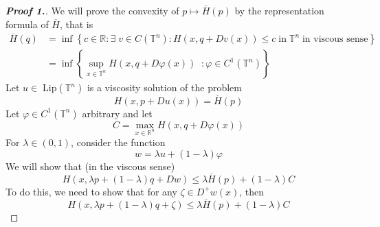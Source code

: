 \documentclass[12pt, oneside]{amsart}  	%
\begin{document}
\begin{proof}[\textbf{Proof 1.}] 
We will prove the convexity of $p\longmapsto\overline{H}(p)$ by the representation formula of $\overline{H}$, that is
\begin{align*}
\overline{H}(q) &= \inf \left\lbrace c\in \mathbb{R}: \exists\;v\in C(\mathbb{T}^n): H(x,q+Dv(x))\leq c\;\text{in}\;\mathbb{T}^n\;\text{in viscous sense}\right\rbrace \\
	            &= \inf\left\lbrace \sup_{x\in \mathbb{T}^n} H(x,q+D\varphi(x))\;\;:\varphi\in C^1(\mathbb{T}^n)\right\rbrace
\end{align*}
Let $u\in\;\text{Lip}(\mathbb{T}^n)$ is a viscosity solution of the problem
\begin{equation}\label{Epp}
H(x,p+Du(x)) = \overline{H}(p) \tag{$E_p$}
\end{equation}
Let $\varphi\in C^1(\mathbb{T}^n)$ arbitrary and let
\begin{equation*}
C = \max_{x\in \mathbb{R}^n} H(x,q+D\varphi(x))
\end{equation*}
For $\lambda\in (0,1)$, consider the function
\begin{equation*}
w = \lambda u + (1-\lambda) \varphi
\end{equation*}
We will show that (in the viscous sense)
\begin{equation}\label{Elambda p + 1-lambda q}
H\left(x,\lambda p +(1-\lambda)q+ Dw\right) \leq \lambda \overline{H}(p) + (1-\lambda)C 
\end{equation}
To do this, we need to show that for any $\zeta\in D^+w(x)$, then
\begin{equation*}
H\left(x,\lambda p +(1-\lambda)q+ \zeta\right) \leq \lambda \overline{H}(p) + (1-\lambda)C 
\end{equation*}
\vspace*{0.1cm}

\end{proof}
\end{document}
